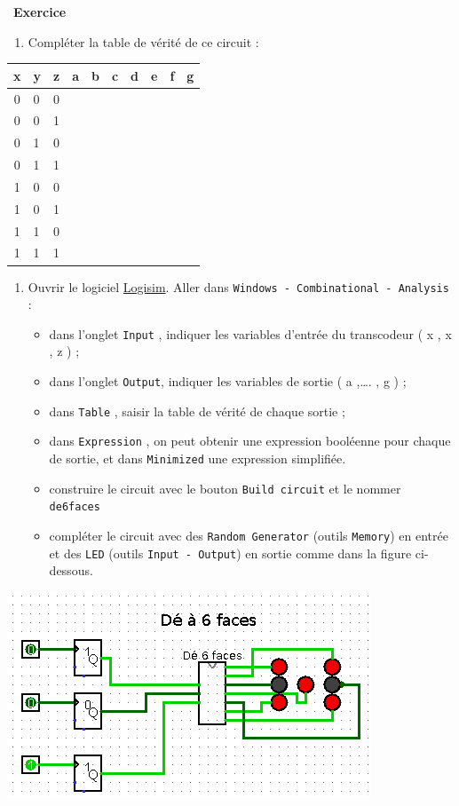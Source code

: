 \documentclass[
  11pt,
]{article}
\newcommand{\passthrough}[1]{#1}
\providecommand{\tightlist}{%
  \setlength{\itemsep}{0pt}\setlength{\parskip}{0pt}}
\newcounter{exo}
\newenvironment{exercice}[1]
{\par \medskip   \addtocounter{exo}{1} \noindent  
\begin{bclogo}[arrondi =0.1,   noborder = true, logo=\bccrayon, marge=4]{~\textbf{Exercice} \textbf{\theexo} {\itshape #1} }  \par}
{
\end{bclogo}
 \par \bigskip }
\newcounter{def}
\newcounter{logi}
\begin{document}
\begin{exercice}{}
\begin{enumerate}
\def\labelenumi{\arabic{enumi}.}
\tightlist
\item
  Compléter la table de vérité de ce circuit :
\end{enumerate}

\begin{longtable}[]{@{}clllllllll@{}}
\toprule
x & y & z & a & b & c & d & e & f & g\tabularnewline
\midrule
\endhead
0 & 0 & 0 & & & & & & &\tabularnewline
0 & 0 & 1 & & & & & & &\tabularnewline
0 & 1 & 0 & & & & & & &\tabularnewline
0 & 1 & 1 & & & & & & &\tabularnewline
1 & 0 & 0 & & & & & & &\tabularnewline
1 & 0 & 1 & & & & & & &\tabularnewline
1 & 1 & 0 & & & & & & &\tabularnewline
1 & 1 & 1 & & & & & & &\tabularnewline
\bottomrule
\end{longtable}

\begin{enumerate}
\def\labelenumi{\arabic{enumi}.}
\setcounter{enumi}{1}
\tightlist
\item
  Ouvrir le logiciel \href{http://www.cburch.com/logisim/}{Logisim}.
  Aller dans
  \passthrough{\lstinline!Windows - Combinational - Analysis!} :

  \begin{itemize}
  \tightlist
  \item
    dans l'onglet \passthrough{\lstinline!Input!} , indiquer les
    variables d'entrée du transcodeur ( x , x , z ) ;
  \item
    dans l'onglet \passthrough{\lstinline!Output!}, indiquer les
    variables de sortie ( a ,\ldots. , g ) ;
  \item
    dans \passthrough{\lstinline!Table!} , saisir la table de vérité de
    chaque sortie ;
  \item
    dans \passthrough{\lstinline!Expression!} , on peut obtenir une
    expression booléenne pour chaque de sortie, et dans
    \passthrough{\lstinline!Minimized!} une expression simplifiée.
  \item
    construire le circuit avec le bouton
    \passthrough{\lstinline!Build circuit!} et le nommer
    \passthrough{\lstinline!de6faces!}
  \item
    compléter le circuit avec des
    \passthrough{\lstinline!Random Generator!} (outils
    \passthrough{\lstinline!Memory!}) en entrée et des
    \passthrough{\lstinline!LED!} (outils
    \passthrough{\lstinline!Input - Output!}) en sortie comme dans la
    figure ci-dessous.
  \end{itemize}
\end{enumerate}

\includegraphics{images/de_6_faces.png}\\

\end{exercice}
\end{document}
